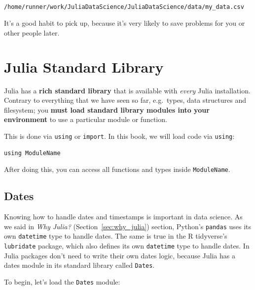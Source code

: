 \documentclass[
  notoc %
]{tufte-book}
\newcommand{\passthrough}[1]{#1}
\begin{document}
\begin{lstlisting}[language=Output]

/home/runner/work/JuliaDataScience/JuliaDataScience/data/my_data.csv

\end{lstlisting}

It's a good habit to pick up, because it's very likely to save problems
for you or other people later.

\hypertarget{sec:standardlibrary}{%
\section{Julia Standard Library}\label{sec:standardlibrary}}

Julia has a \textbf{rich standard library} that is available with
\emph{every} Julia installation. Contrary to everything that we have
seen so far, e.g.~types, data structures and filesystem; you
\textbf{must load standard library modules into your environment} to use
a particular module or function.

This is done via \passthrough{\lstinline!using!} or
\passthrough{\lstinline!import!}. In this book, we will load code via
\passthrough{\lstinline!using!}:

\begin{lstlisting}
using ModuleName
\end{lstlisting}

After doing this, you can access all functions and types inside
\passthrough{\lstinline!ModuleName!}.

\hypertarget{sec:dates}{%
\subsection{Dates}\label{sec:dates}}

Knowing how to handle dates and timestamps is important in data science.
As we said in \emph{Why Julia?} (Section~\ref{sec:why_julia}) section,
Python's \passthrough{\lstinline!pandas!} uses its own
\passthrough{\lstinline!datetime!} type to handle dates. The same is
true in the R tidyverse's \passthrough{\lstinline!lubridate!} package,
which also defines its own \passthrough{\lstinline!datetime!} type to
handle dates. In Julia packages don't need to write their own dates
logic, because Julia has a dates module in its standard library called
\passthrough{\lstinline!Dates!}.

To begin, let's load the \passthrough{\lstinline!Dates!} module:
\end{document}
